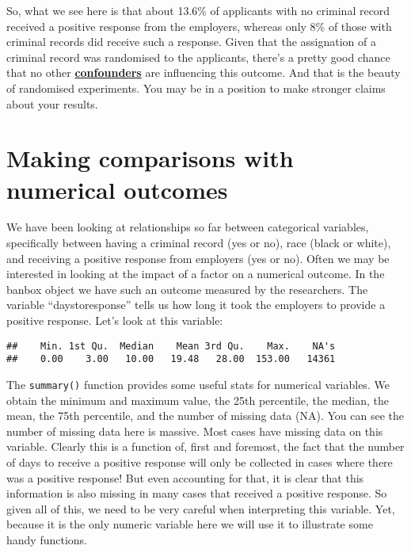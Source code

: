 \documentclass[
]{book}
\newenvironment{Shaded}{\begin{snugshade}}{\end{snugshade}}
\newcommand{\FunctionTok}[1]{\textcolor[rgb]{0.13,0.29,0.53}{\textbf{#1}}}
\newcommand{\NormalTok}[1]{#1}
\newcommand{\SpecialCharTok}[1]{\textcolor[rgb]{0.81,0.36,0.00}{\textbf{#1}}}
\begin{document}
So, what we see here is that about 13.6\% of applicants with no criminal record received a positive response from the employers, whereas only 8\% of those with criminal records did receive such a response. Given that the assignation of a criminal record was randomised to the applicants, there's a pretty good chance that no other \href{https://en.wikipedia.org/wiki/Confounding}{\textbf{confounders}} are influencing this outcome. And that is the beauty of randomised experiments. You may be in a position to make stronger claims about your results.

\section{Making comparisons with numerical outcomes}\label{making-comparisons-with-numerical-outcomes}

We have been looking at relationships so far between categorical variables, specifically between having a criminal record (yes or no), race (black or white), and receiving a positive response from employers (yes or no). Often we may be interested in looking at the impact of a factor on a numerical outcome. In the banbox object we have such an outcome measured by the researchers. The variable ``daystoresponse'' tells us how long it took the employers to provide a positive response. Let's look at this variable:

\begin{Shaded}
\end{Shaded}

\begin{verbatim}
##    Min. 1st Qu.  Median    Mean 3rd Qu.    Max.    NA's 
##    0.00    3.00   10.00   19.48   28.00  153.00   14361
\end{verbatim}

The \texttt{summary()} function provides some useful stats for numerical variables. We obtain the minimum and maximum value, the 25th percentile, the median, the mean, the 75th percentile, and the number of missing data (NA). You can see the number of missing data here is massive. Most cases have missing data on this variable. Clearly this is a function of, first and foremost, the fact that the number of days to receive a positive response will only be collected in cases where there was a positive response! But even accounting for that, it is clear that this information is also missing in many cases that received a positive response. So given all of this, we need to be very careful when interpreting this variable. Yet, because it is the only numeric variable here we will use it to illustrate some handy functions.
\end{document}
